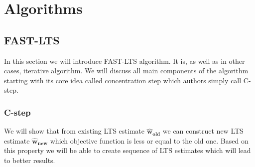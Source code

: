 \chapter{Algorithms}

\newcommand{\paramhat}[1]{\boldsymbol{\hat{\textbf{#1}}}}
\newcommand{\param}[1]{\textbf{\text{#1}}}
\newcommand\numberthis{\addtocounter{equation}{1}\tag{\theequation}}
\newcommand{\showVec}[3]{\vec{#1} = (\lowercase{#2}_1, \lowercase{#2}_2,\ldots,\lowercase{#2}_#3)}
\newcommand{\m}[1]{\boldsymbol{\uppercase{#1}}}

\let\vec\boldsymbol



\section{FAST-LTS}
In this section we will introduce FAST-LTS algorithm\cite{rouss:2000}. 
It is, as well as in other cases, iterative algorithm. We will discuss all main components
of the algorithm starting with its core idea called concentration step which 
authors simply call C-step.


\subsection{C-step}
We will show that from existing LTS estimate $\boldsymbol{\hat{w}_{old}}$ we 
can construct new LTS estimate $\boldsymbol{\hat{w}_{new}}$ which objective 
function is less or equal to the old one. Based on this property we will be able 
to create sequence of LTS estimates which will lead to better results.


\newcommand{\what}[1]{
	\vec{\hat{w}_#1}
}
\newcommand{\whatn}{
	\vec{\hat{w}}
}



